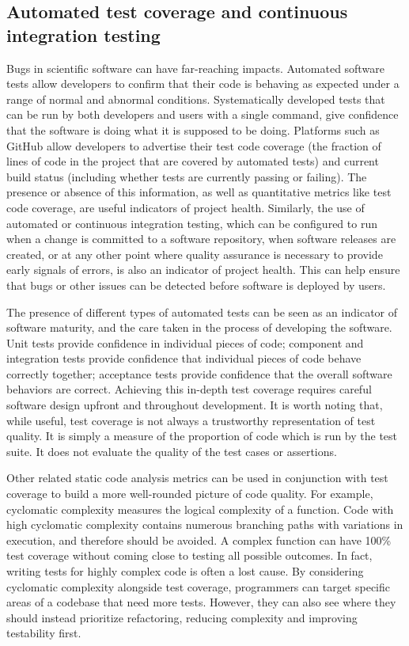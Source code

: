 \documentclass{article}
\begin{document}
\subsection{Automated test coverage and continuous integration testing}
Bugs in scientific software can have far-reaching impacts. Automated software tests allow developers to confirm that their code is behaving as expected under a range of normal and abnormal conditions. Systematically developed tests that can be run by both developers and users with a single command, give confidence that the software is doing what it is supposed to be doing. Platforms such as GitHub allow developers to advertise their test code coverage (the fraction of lines of code in the project that are covered by automated tests) and current build status (including whether tests are currently passing or failing). The presence or absence of this information, as well as quantitative metrics like test code coverage, are useful indicators of project health. Similarly, the use of automated or continuous integration testing, which can be configured to run when a change is committed to a software repository, when software releases are created, or at any other point where quality assurance is necessary to provide early signals of errors, is also an indicator of project health. This can help ensure that bugs or other issues can be detected before software is deployed by users.

The presence of different types of automated tests can be seen as an indicator of software maturity, and the care taken in the process of developing the software. Unit tests provide confidence in individual pieces of code; component and integration tests provide confidence that individual pieces of code behave correctly together; acceptance tests provide confidence that the overall software behaviors are correct. Achieving this in-depth test coverage requires careful software design upfront and throughout development. It is worth noting that, while useful, test coverage is not always a trustworthy representation of test quality. It is simply a measure of the proportion of code which is run by the test suite. It does not evaluate the quality of the test cases or assertions.

Other related static code analysis metrics can be used in conjunction with test coverage to build a more well-rounded picture of code quality. For example, cyclomatic complexity measures the logical complexity of a function. Code with high cyclomatic complexity contains numerous branching paths with variations in execution, and therefore should be avoided. A complex function can have 100\% test coverage without coming close to testing all possible outcomes. In fact, writing tests for highly complex code is often a lost cause. By considering cyclomatic complexity alongside test coverage, programmers can target specific areas of a codebase that need more tests. However, they can also see where they should instead prioritize refactoring, reducing complexity and improving testability first.
\end{document}
